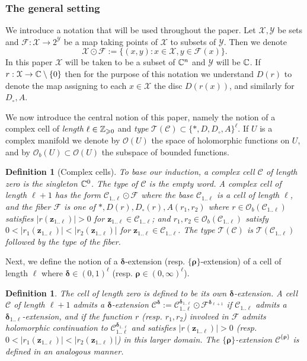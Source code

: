 \documentclass[reqno]{amsart}
\newtheorem{Def}[Cor]{Definition}{\bfseries}{\rmfamily}
\renewcommand\ge{\geqslant} \renewcommand\le{\leqslant}
\renewcommand\~[1]{\widetilde{#1}}
\def\cF{{\mathcal F}} \def\cL{{\mathcal L}} \def\cR{{\mathcal R}}
\def\cT{{\mathcal T}} \def\cD{{\mathcal D}} \def\cC{{\mathcal C}}
\def\cO{{\mathcal O}}
\def\cX{{\mathcal X}}
\def\cY{{\mathcal Y}}
\def\vz{{\mathbf z}}
\def\vdelta{{\boldsymbol\delta}}
\def\vrho{{\boldsymbol\rho}}
\def\he#1{{\{#1\}}}
\def\hvrho{{\he\vrho}}
\begin{document}
\subsubsection{The general setting}

We introduce a notation that will be used throughout the paper. Let
$\cX,\cY$ be sets and $\cF:\cX\to2^\cY$ be a map taking points of
$\cX$ to subsets of $\cY$. Then we denote
\begin{equation}
  \cX\odot\cF := \{(x,y) : x\in\cX, y\in\cF(x)\}.
\end{equation}
In this paper $\cX$ will be taken to be a subset of ${\mathbb C}^n$ and $\cY$
will be ${\mathbb C}$. If $r:\cX\to\C\setminus\{0\}$ then for the purpose of
this notation we understand $D(r)$ to denote the map assigning to each
$x\in\cX$ the disc $D(r(x))$, and similarly for $D_\circ,A$.

We now introduce the central notion of this paper, namely the notion
of a complex cell of \emph{length} $\ell\in\Z_{\ge0}$ and \emph{type}
$\cT(\cC)\subset\{*,D,D_\circ,A\}^\ell$. If $U$ is a complex manifold
we denote by $\cO(U)$ the space of holomorphic functions on $U$, and
by $\cO_b(U)\subset\cO(U)$ the subspace of bounded functions.

\begin{Def}[Complex cells]\label{def:cells}
  To base our induction, a complex cell $\cC$ of \emph{length} zero is
  the singleton ${\mathbb C}^0$. The \emph{type} of $\cC$ is the empty word.  A
  complex cell of length $\ell+1$ has the form $\cC_{1..\ell}\odot\cF$
  where the \emph{base} $\cC_{1..\ell}$ is a cell of length $\ell$,
  and the \emph{fiber} $\cF$ is one of $*,D(r),D_\circ(r),A(r_1,r_2)$
  where $r\in\cO_b(\cC_{1..\ell})$ satisfies $|r(\vz_{1..\ell})|>0$
  for $\vz_{1..\ell}\in\cC_{1..\ell}$; and
  $r_1,r_2\in\cO_b(\cC_{1..\ell})$ satisfy
  $0<|r_1(\vz_{1..\ell})|<|r_2(\vz_{1..\ell})|$ for
  $\vz_{1..\ell}\in\cC_{1..\ell}$. The type $\cT(\cC)$ is
  $\cT(\cC_{1..\ell})$ followed by the type of the fiber.
\end{Def}
Next, we define the notion of a $\vdelta$-extension (resp.
$\hvrho$-extension) of a cell of length $\ell$ where
$\vdelta\in(0,1)^\ell$ (resp. $\vrho\in(0,\infty)^\ell$).
\begin{Def}
  The cell of length zero is defined to be its own
  $\vdelta$-extension. A cell $\cC$ of length $\ell+1$ admits a
  $\vdelta$-extension
  $\cC^\vdelta:=\cC_{1..\ell}^{\vdelta_{1..\ell}}\odot\cF^{\vdelta_{\ell+1}}$
  if $\cC_{1..\ell}$ admits a $\vdelta_{1..\ell}$-extension, and if
  the function $r$ (resp. $r_1,r_2$) involved in $\cF$ admits
  holomorphic continuation to $\cC_{1..\ell}^{\vdelta_{1..\ell}}$ and
  satisfies $|r(\vz_{1..\ell})|>0$
  (resp. $0<|r_1(\vz_{1..\ell})|<|r_2(\vz_{1..\ell})|$) in this larger
  domain. The $\hvrho$-extension $\cC^\hvrho$ is defined in an
  analogous manner.
\end{Def}
\end{document}
